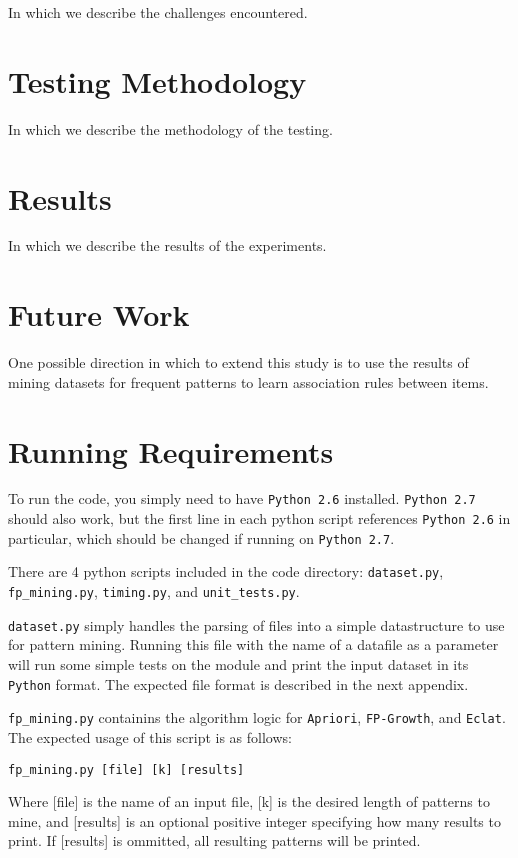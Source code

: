 \documentclass[11pt]{article}
\begin{document}
\begin{multicols}{2}
In which we describe the challenges encountered.

\section{Testing Methodology}

In which we describe the methodology of the testing.

\section{Results}
\label{sec:results}

In which we describe the results of the experiments.

\section{Future Work}

One possible direction in which to extend this study is to use the
results of mining datasets for frequent patterns to learn association
rules between items. \cite{wiki_arl}

\appendix
\section{Running Requirements}

To run the code, you simply need to have \texttt{Python 2.6}
installed.  \texttt{Python 2.7} should also work, but the first line
in each python script references \texttt{Python 2.6} in particular,
which should be changed if running on \texttt{Python 2.7}.

There are 4 python scripts included in the code directory:
\texttt{dataset.py}, \texttt{fp\_mining.py}, \texttt{timing.py}, and
\texttt{unit\_tests.py}.

\texttt{dataset.py} simply handles the parsing of files into a simple
datastructure to use for pattern mining.  Running this file with the
name of a datafile as a parameter will run some simple tests on the
module and print the input dataset in its \texttt{Python} format.  The
expected file format is described in the next appendix.

\texttt{fp\_mining.py} containins the algorithm logic for
\texttt{Apriori}, \texttt{FP-Growth}, and \texttt{Eclat}.  The
expected usage of this script is as follows:

\texttt{fp\_mining.py [file] [k] [results]}

Where [file] is the name of an input file, [k] is the desired length
of patterns to mine, and [results] is an optional positive integer
specifying how many results to print.  If [results] is ommitted, all
resulting patterns will be printed.


\end{multicols}
\end{document}
